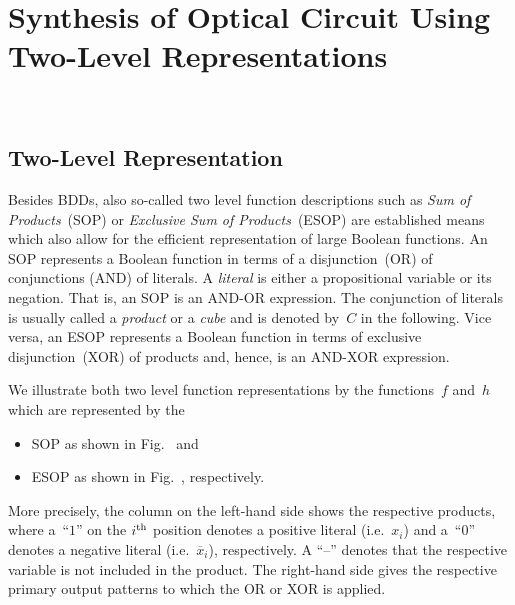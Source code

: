 \documentclass[10pt,letterpaper,twoside,openright]{book}
\begin{document}

\chapter{Synthesis of Optical Circuit Using Two-Level Representations}~\label{ch:synth-two-level}

\section{Two-Level Representation}
Besides BDDs, also so-called two level function descriptions such as
\emph{Sum of Products}~(SOP) or \emph{Exclusive Sum of Products}~(ESOP)
are established means which also allow for the efficient representation
of large Boolean functions.
An SOP represents a Boolean function in terms of 
a disjunction~(OR) of conjunctions (AND) of literals.
A \emph{literal} is either a propositional variable or its negation.
That is, an SOP is an AND-OR expression.
The conjunction of literals is usually called a \emph{product} or a \emph{cube}
and is denoted by~$C$ in the following.
Vice versa, an ESOP represents a Boolean function in terms of 
exclusive disjunction~(XOR) of products and, hence, is an AND-XOR expression.
\begin{example}
We illustrate both two level function representations by the functions~$f$ and~$h$ which are represented by the
\begin{itemize}
\item SOP as shown in Fig.~ and
\item ESOP as shown in Fig.~, respectively.
\end{itemize}
More precisely, the column on the left-hand side shows the respective products, where a~``$1$'' on
the $i^{\rm th}$ position denotes a positive literal (i.e.~$x_i$) and a~``$0$'' denotes a negative
literal (i.e.~$\overline{x}_i$), respectively.
A ``--'' denotes that the respective variable is not included in the product.
The right-hand side gives the respective primary output patterns to which the OR or XOR is applied.
\end{example}
\end{document}
